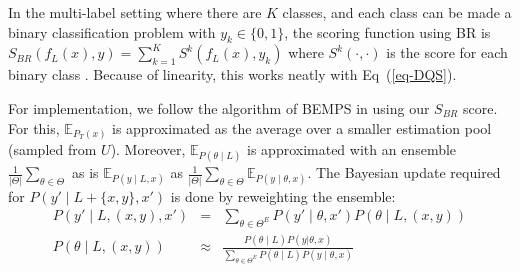 \documentclass[letterpaper]{article} %
\newcommand{\argmax}{\mbox{argmax}}
\begin{document}
 In the multi-label setting where there are $K$ classes, and each class can be made a binary classification problem with $y_{k} \in \{0,1 \}$, the scoring function using BR is
  $S_{BR}( f_L(x),y) =\sum_{k=1}^{K}S^k(f_L(x),y_k)$
where $S^k(\cdot,\cdot)$ is the score for each binary class \cite{dawid2014theory}.  Because of linearity, this works neatly with Eq~(\ref{eq-DQS}).



For implementation, we follow the algorithm of BEMPS in  \cite{TanDuBun-IEEEPAMI23} using our $S_{BR}$ score.
For this,
$\mathbb{E}_{P_T(x)}$ is approximated as the average over a smaller estimation pool (sampled from $U$). Moreover, $\mathbb{E}_{ P(\theta \mid L) }$ is approximated with an ensemble $\frac{1}{|\Theta|}\sum_{\theta\in\Theta} $
 as is 
$\mathbb{E}_{ P(y \mid L,x) }$ as
$\frac{1}{|\Theta|}\sum_{\theta\in\Theta} \mathbb{E}_{ P(y \mid \theta,x) }$.  The Bayesian update required for $P(y' \mid L+\{x,y\},x')$ is done by reweighting the ensemble:
{\scriptsize
\begin{eqnarray}
    P(y' \mid L, (x, y), x') &=& \sum_{\theta\in\Theta^E} P(y' \mid \theta, x') P(\theta \mid L, (x, y))
    \label{eq-3}\\
P(\theta \mid L, (x, y)) & \approx&
\frac{P(\theta \mid L) P(y|\theta,x)}
    {\sum_{\theta\in\Theta^E} P(\theta\mid L) P(y \mid \theta,x)} \label{eq-4}
\end{eqnarray} }
\end{document}
